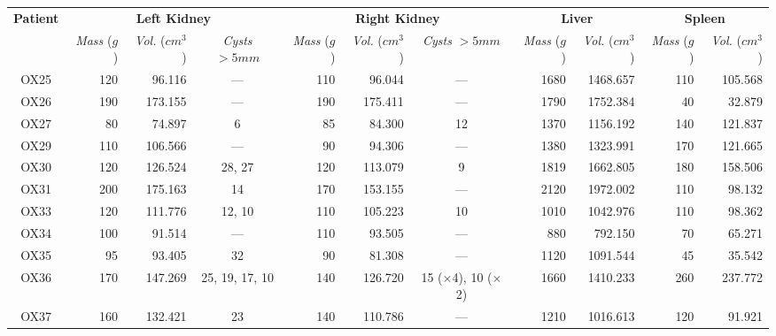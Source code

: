 \begin{landscape}
\begin{table}[p]
\footnotesize
\begin{center}
\begin{tabular}{c|rrc|rrc|rr|rr}
\textbf{Patient} & \multicolumn{3}{|c|}{\textbf{Left Kidney}} & \multicolumn{3}{|c|}{\textbf{Right Kidney}} & \multicolumn{2}{|c|}{\textbf{Liver}} & \multicolumn{2}{|c}{\textbf{Spleen}} \\
& \emph{Mass} ($g$) & \emph{Vol.} ($\mathit{cm}^3$) & \emph{Cysts} $> 5\mathit{mm}$ & \emph{Mass} ($g$) & \emph{Vol.} ($\mathit{cm}^3$) & \emph{Cysts} $> 5\mathit{mm}$ & \emph{Mass} ($g$) & \emph{Vol.} ($\mathit{cm}^3$) & \emph{Mass} ($g$) & \emph{Vol.} ($\mathit{cm}^3$) \\
\hline
\hline
OX25 & 120 &  96.116 &            --- & 110 &  96.044 &                            --- & 1680 & 1468.657 & 110 & 105.568 \\
OX26 & 190 & 173.155 &            --- & 190 & 175.411 &                            --- & 1790 & 1752.384 &  40 &  32.879 \\
OX27 &  80 &  74.897 &              6 &  85 &  84.300 &                             12 & 1370 & 1156.192 & 140 & 121.837 \\
OX29 & 110 & 106.566 &            --- &  90 &  94.306 &                            --- & 1380 & 1323.991 & 170 & 121.665 \\
OX30 & 120 & 126.524 &         28, 27 & 120 & 113.079 &                              9 & 1819 & 1662.805 & 180 & 158.506 \\
OX31 & 200 & 175.163 &             14 & 170 & 153.155 &                            --- & 2120 & 1972.002 & 110 &  98.132 \\
OX33 & 120 & 111.776 &         12, 10 & 110 & 105.223 &                             10 & 1010 & 1042.976 & 110 &  98.362 \\
OX34 & 100 &  91.514 &            --- & 110 &  93.505 &                            --- &  880 &  792.150 &  70 &  65.271 \\
OX35 &  95 &  93.405 &             32 &  90 &  81.308 &                            --- & 1120 & 1091.544 &  45 &  35.542 \\
OX36 & 170 & 147.269 & 25, 19, 17, 10 & 140 & 126.720 & 15 ($\times$4), 10 ($\times$2) & 1660 & 1410.233 & 260 & 237.772 \\
OX37 & 160 & 132.421 &             23 & 140 & 110.786 &                            --- & 1210 & 1016.613 & 120 &  91.921 \\

\end{tabular}
\end{center}
\end{table}
\end{landscape}
